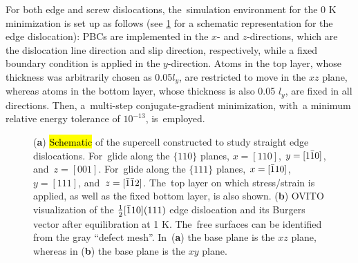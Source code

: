 \documentclass[applsci,article,accept,pdftex,moreauthors]{Definitions/mdpi}
\newcommand{\?}{\stackrel{?}{=}}
\begin{document}
For both edge and screw dislocations, the~simulation environment for the 0 K minimization is set up as follows (see \cref{Fig:DislocStructure} for a schematic representation for the edge dislocation): PBCs are implemented in the $x$- and $z$-directions, which are the dislocation line direction and slip direction, respectively, while a fixed boundary condition is applied in the $y$-direction. Atoms in the top layer, whose thickness was arbitrarily chosen as 0.05$l_y$, %
are restricted to move in the $xz$ plane, whereas atoms in the bottom layer, whose thickness is also 0.05 $l_y$, are fixed in all directions. Then, a~multi-step conjugate-gradient minimization, with~a minimum relative energy tolerance of $10^{-13}$, is~employed.

\begin{figure}[H]
{\captionsetup{position=bottom,justification=centering}
\hfill
{}
}
\caption{(\textbf{a}) \hl{Schematic} %
 of the supercell constructed to study straight edge dislocations. For~glide along the $\{ 110 \}$ planes, $x = [110]$, $y = [ 1 \Bar{1} 0 ]$, and~$z = [001]$. For~glide along the $\{ 111 \}$ planes, $x= [ \Bar{1} 1 0 ]$, $y = [111]$, and~$z = [ \Bar{1} \Bar{1} 2 ]$. The~top layer on which stress/strain is applied, as well as the fixed bottom layer, is also shown. (\textbf{b}) OVITO visualization of the $\frac{1}{2} [\Bar{1}10] (111)$ edge dislocation and its Burgers vector after equilibration at 1 K. The~free surfaces can be identified from the gray ``defect mesh''. In~(\textbf{a}) the base plane is the $xz$ plane, whereas in (\textbf{b}) the base plane is the $xy$ plane.}
\label{Fig:DislocStructure}
\end{figure}
\end{document}
